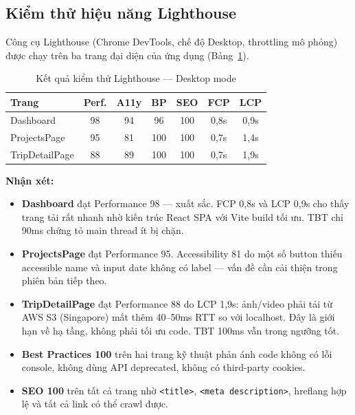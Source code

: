 \documentclass[../DoAn.tex]{subfiles}
\begin{document}
\subsection{Kiểm thử hiệu năng Lighthouse}

Công cụ Lighthouse (Chrome DevTools, chế độ Desktop, throttling mô phỏng) được chạy trên ba trang đại diện của ứng dụng (Bảng~\ref{tab:lighthouse}).

\begin{table}[H]
\centering
\caption{Kết quả kiểm thử Lighthouse — Desktop mode}
\label{tab:lighthouse}
\small
\begin{tabular}{|p{3.5cm}|c|c|c|c|c|c|}
\hline
\textbf{Trang} & \textbf{Perf.} & \textbf{A11y} & \textbf{BP} & \textbf{SEO} & \textbf{FCP} & \textbf{LCP} \\
\hline
Dashboard & 98 & 94 & 96 & 100 & 0,8s & 0,9s \\
\hline
ProjectsPage & 95 & 81 & 100 & 100 & 0,7s & 1,4s \\
\hline
TripDetailPage & 88 & 89 & 100 & 100 & 0,7s & 1,9s \\
\hline
\end{tabular}
\end{table}

\textbf{Nhận xét:}

\begin{itemize}[leftmargin=*, topsep=4pt, itemsep=2pt]
  \item \textbf{Dashboard} đạt Performance 98 — xuất sắc. FCP 0,8s và LCP 0,9s cho thấy trang tải rất nhanh nhờ kiến trúc React SPA với Vite build tối ưu. TBT chỉ 90ms chứng tỏ main thread ít bị chặn.
  \item \textbf{ProjectsPage} đạt Performance 95. Accessibility 81 do một số button thiếu accessible name và input date không có label — vấn đề cần cải thiện trong phiên bản tiếp theo.
  \item \textbf{TripDetailPage} đạt Performance 88 do LCP 1,9s: ảnh/video phải tải từ AWS S3 (Singapore) mất thêm 40--50ms RTT so với localhost. Đây là giới hạn về hạ tầng, không phải tối ưu code. TBT 100ms vẫn trong ngưỡng tốt.
  \item \textbf{Best Practices 100} trên hai trang kỹ thuật phản ánh code không có lỗi console, không dùng API deprecated, không có third-party cookies.
  \item \textbf{SEO 100} trên tất cả trang nhờ \texttt{<title>}, \texttt{<meta description>}, hreflang hợp lệ và tất cả link có thể crawl được.
\end{itemize}
\end{document}
